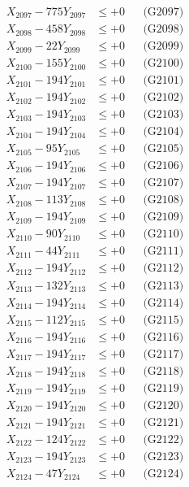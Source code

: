 \documentclass[a4paper,10pt]{article}
\begin{document}
{\begin{align}
X_{2097} - 775Y_{2097} &\leq +0 && \text{(G2097)} \\
X_{2098} - 458Y_{2098} &\leq +0 && \text{(G2098)} \\
X_{2099} - 22Y_{2099} &\leq +0 && \text{(G2099)} \\
X_{2100} - 155Y_{2100} &\leq +0 && \text{(G2100)} \\
\allowbreak
X_{2101} - 194Y_{2101} &\leq +0 && \text{(G2101)} \\
X_{2102} - 194Y_{2102} &\leq +0 && \text{(G2102)} \\
X_{2103} - 194Y_{2103} &\leq +0 && \text{(G2103)} \\
X_{2104} - 194Y_{2104} &\leq +0 && \text{(G2104)} \\
X_{2105} - 95Y_{2105} &\leq +0 && \text{(G2105)} \\
X_{2106} - 194Y_{2106} &\leq +0 && \text{(G2106)} \\
X_{2107} - 194Y_{2107} &\leq +0 && \text{(G2107)} \\
X_{2108} - 113Y_{2108} &\leq +0 && \text{(G2108)} \\
X_{2109} - 194Y_{2109} &\leq +0 && \text{(G2109)} \\
X_{2110} - 90Y_{2110} &\leq +0 && \text{(G2110)} \\
\allowbreak
X_{2111} - 44Y_{2111} &\leq +0 && \text{(G2111)} \\
X_{2112} - 194Y_{2112} &\leq +0 && \text{(G2112)} \\
X_{2113} - 132Y_{2113} &\leq +0 && \text{(G2113)} \\
X_{2114} - 194Y_{2114} &\leq +0 && \text{(G2114)} \\
X_{2115} - 112Y_{2115} &\leq +0 && \text{(G2115)} \\
X_{2116} - 194Y_{2116} &\leq +0 && \text{(G2116)} \\
X_{2117} - 194Y_{2117} &\leq +0 && \text{(G2117)} \\
X_{2118} - 194Y_{2118} &\leq +0 && \text{(G2118)} \\
X_{2119} - 194Y_{2119} &\leq +0 && \text{(G2119)} \\
X_{2120} - 194Y_{2120} &\leq +0 && \text{(G2120)} \\
\allowbreak
X_{2121} - 194Y_{2121} &\leq +0 && \text{(G2121)} \\
X_{2122} - 124Y_{2122} &\leq +0 && \text{(G2122)} \\
X_{2123} - 194Y_{2123} &\leq +0 && \text{(G2123)} \\
X_{2124} - 47Y_{2124} &\leq +0 && \text{(G2124)} \\

\end{align}}
\end{document}
